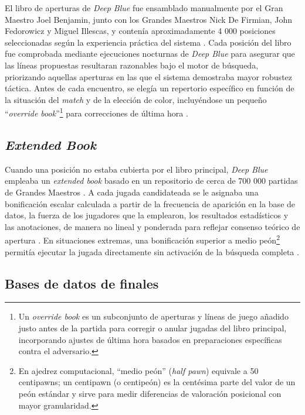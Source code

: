 \documentclass[a4paper, 12pt]{article}
\begin{document}
El libro de aperturas de \textit{Deep Blue} fue ensamblado 
manualmente por el Gran Maestro Joel Benjamin, junto con los 
Grandes Maestros Nick De Firmian, John Fedorowicz y Miguel Illescas, 
y contenía aproximadamente 4 000 posiciones seleccionadas según 
la experiencia práctica del sistema \cite{campbell2002deep}. Cada 
posición del libro fue comprobada mediante ejecuciones nocturnas 
de \textit{Deep Blue} para asegurar que las líneas propuestas 
resultaran razonables bajo el motor de búsqueda, priorizando 
aquellas aperturas en las que el sistema demostraba mayor 
robustez táctica. Antes de cada encuentro, 
se elegía un repertorio específico en función de la situación 
del \emph{match} y de la elección de color, incluyéndose un pequeño 
“\emph{override book}”\footnote{Un \emph{override book} es un 
subconjunto de aperturas y líneas de juego añadido justo antes 
de la partida para corregir o anular jugadas del libro principal, 
incorporando ajustes de última hora basados en preparaciones 
específicas contra el adversario.} 
para correcciones de última hora \cite{campbell2002deep}.

\subsection{\emph{Extended Book}}

Cuando una posición no estaba cubierta por el libro principal, 
\textit{Deep Blue} empleaba un \emph{extended book} basado en un 
repositorio de cerca de 700 000 partidas de Grandes Maestros 
\cite{campbell2002deep}. A cada jugada candidateada se le asignaba 
una bonificación escalar calculada a partir de la frecuencia de 
aparición en la base de datos, la fuerza de los jugadores que la 
emplearon, los resultados estadísticos y las anotaciones, 
de manera no lineal y ponderada para 
reflejar consenso teórico de apertura \cite{campbell2002deep}. 
En situaciones extremas, una bonificación superior a medio 
peón\footnote{En ajedrez computacional, “medio peón” (\emph{half pawn}) 
equivale a 50 centipawns; un centipawn (o centipeón) es la centésima parte 
del valor de un peón estándar y sirve para medir diferencias de 
valoración posicional con mayor granularidad.} 
permitía ejecutar la jugada directamente sin activación de 
la búsqueda completa \cite{campbell2002deep}.

\subsection{Bases de datos de finales}
\end{document}
